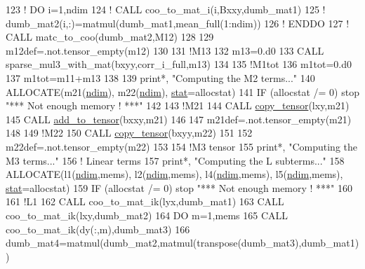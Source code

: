 \begin{DoxyCode}
123     \textcolor{comment}{! DO i=1,ndim}
124     \textcolor{comment}{!    CALL coo\_to\_mat\_i(i,Bxxy,dumb\_mat1)}
125     \textcolor{comment}{!    dumb\_mat2(i,:)=matmul(dumb\_mat1,mean\_full(1:ndim))}
126     \textcolor{comment}{! ENDDO}
127     \textcolor{comment}{! CALL matc\_to\_coo(dumb\_mat2,M12)}
128 
129     m12def=.not.tensor\_empty(m12)
130 
131     \textcolor{comment}{!M13}
132     m13=0.d0
133     \textcolor{keyword}{CALL }sparse\_mul3\_with\_mat(bxyy,corr\_i\_full,m13)
134 
135     \textcolor{comment}{!M1tot}
136     m1tot=0.d0
137     m1tot=m11+m13
138 
139     print*, \textcolor{stringliteral}{"Computing the M2 terms..."}
140     \textcolor{keyword}{ALLOCATE}(m21(\hyperlink{namespaceparams_a2323fe1773f086e20c14f266351c482b}{ndim}), m22(\hyperlink{namespaceparams_a2323fe1773f086e20c14f266351c482b}{ndim}), \hyperlink{namespacestat}{stat}=allocstat)
141     \textcolor{keywordflow}{IF} (allocstat /= 0) stop \textcolor{stringliteral}{"*** Not enough memory ! ***"}
142 
143     \textcolor{comment}{!M21}
144     \textcolor{keyword}{CALL }\hyperlink{namespacetensor_a4a88ee8077278486c5128ad97617969e}{copy\_tensor}(lxy,m21)
145     \textcolor{keyword}{CALL }\hyperlink{namespacetensor_aad7cd55f3a4cec4676cc7ca34b05f1a8}{add\_to\_tensor}(bxxy,m21)
146 
147     m21def=.not.tensor\_empty(m21)
148     
149     \textcolor{comment}{!M22}
150     \textcolor{keyword}{CALL }\hyperlink{namespacetensor_a4a88ee8077278486c5128ad97617969e}{copy\_tensor}(bxyy,m22)
151 
152     m22def=.not.tensor\_empty(m22)
153     
154     \textcolor{comment}{!M3 tensor}
155     print*, \textcolor{stringliteral}{"Computing the M3 terms..."}
156     \textcolor{comment}{! Linear terms}
157     print*, \textcolor{stringliteral}{"Computing the L subterms..."}
158     \textcolor{keyword}{ALLOCATE}(l1(\hyperlink{namespaceparams_a2323fe1773f086e20c14f266351c482b}{ndim},mems), l2(\hyperlink{namespaceparams_a2323fe1773f086e20c14f266351c482b}{ndim},mems), l4(\hyperlink{namespaceparams_a2323fe1773f086e20c14f266351c482b}{ndim},mems), l5(\hyperlink{namespaceparams_a2323fe1773f086e20c14f266351c482b}{ndim},mems), 
      \hyperlink{namespacestat}{stat}=allocstat)
159     \textcolor{keywordflow}{IF} (allocstat /= 0) stop \textcolor{stringliteral}{"*** Not enough memory ! ***"}
160     
161     \textcolor{comment}{!L1}
162     \textcolor{keyword}{CALL }coo\_to\_mat\_ik(lyx,dumb\_mat1)
163     \textcolor{keyword}{CALL }coo\_to\_mat\_ik(lxy,dumb\_mat2)
164     \textcolor{keywordflow}{DO} m=1,mems
165        \textcolor{keyword}{CALL }coo\_to\_mat\_ik(dy(:,m),dumb\_mat3)
166        dumb\_mat4=matmul(dumb\_mat2,matmul(transpose(dumb\_mat3),dumb\_mat1))

\end{DoxyCode}
